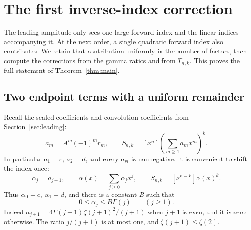 \section{The first inverse-index correction}\label{sec:correction}

The leading amplitude only sees one large forward index and the linear
indices accompanying it. At the next order, a single quadratic forward
index also contributes. We retain that contribution uniformly in the number
of factors, then compute the corrections from the gamma ratios and from
$T_{n,k}$. This proves the full statement of Theorem~\ref{thm:main}.

\subsection{Two endpoint terms with a uniform remainder}

Recall the scaled coefficients and convolution coefficients from
Section~\ref{sec:leading}:
\[
 a_m=A^m(-1)^m r_m,\qquad
 S_{n,k}=[x^n]\left(\sum_{m\ge1}a_mx^m\right)^k.
\]
In particular $a_1=c$, $a_2=d$, and every $a_m$ is nonnegative. It is
convenient to shift the index once:
\begin{equation}\label{eq:alpha-shift}
 \alpha_j=a_{j+1},\qquad
 \alpha(x)=\sum_{j\ge0}\alpha_jx^j,\qquad
 S_{n,k}=[x^{n-k}]\alpha(x)^k.
\end{equation}
Thus $\alpha_0=c$, $\alpha_1=d$, and there is a constant $B$ such that
\begin{equation}\label{eq:alpha-bound}
 0\le\alpha_j\le B\Gamma(j)\qquad(j\ge1).
\end{equation}
Indeed $a_{j+1}=4\Gamma(j+1)\zeta(j+1)^2/(j+1)$ when $j+1$ is even,
and it is zero otherwise. The ratio $j/(j+1)$ is at most one, and
$\zeta(j+1)\le\zeta(2)$.

